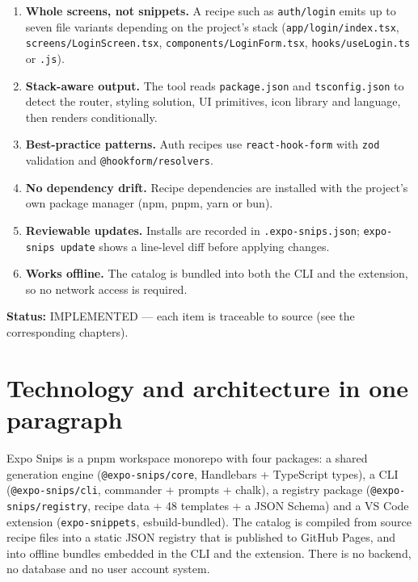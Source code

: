 \begin{enumerate}
  \item \textbf{Whole screens, not snippets.} A recipe such as \texttt{auth/login}
        emits up to seven file variants depending on the project's stack
        (\texttt{app/login/index.tsx}, \texttt{screens/LoginScreen.tsx},
        \texttt{components/LoginForm.tsx}, \texttt{hooks/useLogin.ts} or
        \texttt{.js}).
  \item \textbf{Stack-aware output.} The tool reads \texttt{package.json} and
        \texttt{tsconfig.json} to detect the router, styling solution, UI
        primitives, icon library and language, then renders conditionally.
  \item \textbf{Best-practice patterns.} Auth recipes use
        \texttt{react-hook-form} with \texttt{zod} validation and
        \texttt{@hookform/resolvers}.
  \item \textbf{No dependency drift.} Recipe dependencies are installed with the
        project's own package manager (npm, pnpm, yarn or bun).
  \item \textbf{Reviewable updates.} Installs are recorded in
        \texttt{.expo-snips.json}; \texttt{expo-snips update} shows a line-level
        diff before applying changes.
  \item \textbf{Works offline.} The catalog is bundled into both the CLI and the
        extension, so no network access is required.
\end{enumerate}

\textbf{Status:} IMPLEMENTED --- each item is traceable to source (see the
corresponding chapters).

\section{Technology and architecture in one paragraph}

Expo Snips is a pnpm workspace monorepo with four packages: a shared generation
engine (\texttt{@expo-snips/core}, Handlebars + TypeScript types), a CLI
(\texttt{@expo-snips/cli}, commander + prompts + chalk), a registry package
(\texttt{@expo-snips/registry}, recipe data + 48 templates + a JSON Schema) and
a VS Code extension (\texttt{expo-snippets}, esbuild-bundled). The catalog is
compiled from source recipe files into a static JSON registry that is published
to GitHub Pages, and into offline bundles embedded in the CLI and the extension.
There is no backend, no database and no user account system.

